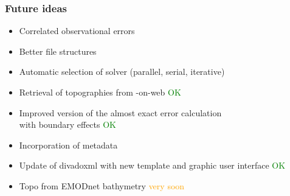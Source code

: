 \begin{frame}[t]
\frametitle{Future ideas}



\begin{itemize}
\item<2-> Correlated observational errors
\item<3-> Better file structures\\
\item<4-> Automatic selection of solver (parallel, serial, iterative)\\
\item<5-> Retrieval of topographies from \diva-on-web \textcolor{green}{OK}
\item<6-> Improved version of the almost exact error calculation\\
 with boundary effects \textcolor{green}{OK}
\item<7-> Incorporation of metadata \\
\item<8-> Update of divadoxml with new template and graphic user interface \textcolor{green}{OK}
\item<9-> Topo from EMODnet bathymetry \textcolor{orange}{very soon}
\end{itemize}

\end{frame}


